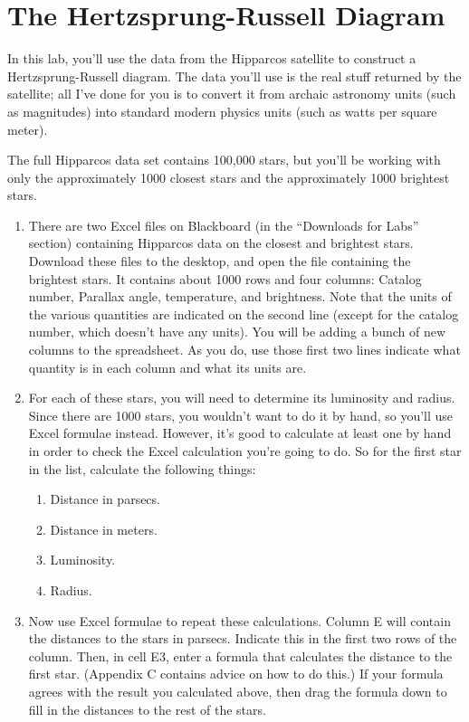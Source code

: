\chapter{The Hertzsprung-Russell Diagram}


In this lab, you'll use the data from the Hipparcos satellite
to construct a Hertzsprung-Russell diagram.  The data you'll
use is the real stuff returned by the satellite; all I've done
for you is to convert it from archaic astronomy units (such as
magnitudes) into standard modern physics units (such as watts per
square meter).

The full Hipparcos data set contains 100,000 stars, but you'll be 
working with only the approximately 
1000 closest stars and the approximately 1000 brightest stars.

\begin{enumerate}

\item There are two Excel files on Blackboard (in the ``Downloads for Labs'' 
section) containing Hipparcos data
on the closest and brightest stars.  Download these files to the desktop,
and open the file containing the brightest stars.  It contains
about 1000 rows and four columns: Catalog number, Parallax angle, 
temperature, and brightness.  Note that the units of the various
quantities are indicated on the second line (except for the catalog
number, which doesn't have any units). 
You will be adding a bunch of new columns to the spreadsheet.  As you
do, use those first two lines indicate what quantity is in each column
and what its units are.

\item For each of these stars, you will need to determine its luminosity
and radius.  Since there are 1000 stars, you wouldn't want to do it by
hand, so you'll use Excel formulae instead.  However, it's good to 
calculate at least one by hand in order to check the Excel calculation
you're going to do.  So for the first star in the list, calculate
the following things:
\begin{enumerate}
\item Distance in parsecs.
\item Distance in meters.
\item Luminosity.
\item Radius.
\end{enumerate}

\vskip 3in

\item Now use Excel formulae to repeat these calculations.
Column E will contain the distances to the stars in parsecs.  Indicate
this in the first two rows of the column.  Then, in cell E3, enter
a formula that calculates the distance to the first star.  
(Appendix C contains advice on how to do this.)  If your
formula agrees with the result you calculated above, then drag
the formula down to fill in the distances to the rest of the stars.


\end{enumerate}
